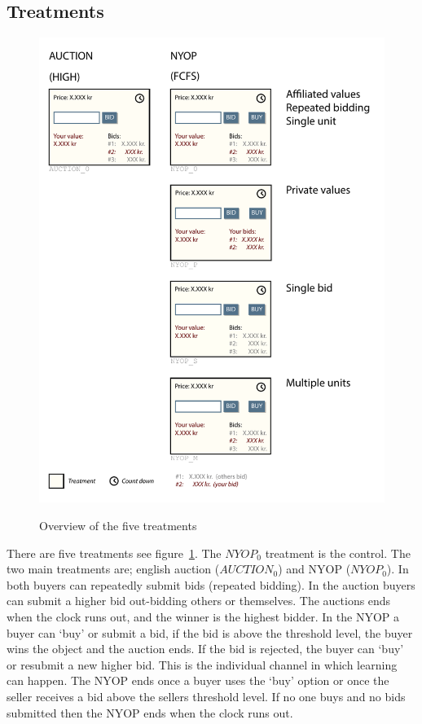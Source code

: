 \documentclass[a4paper,12pt]{article}
\makeatletter
\newcommand\fix{%
  \let\set@color\beamerorig@set@color
  \let\reset@color\beamerorig@reset@color}
\makeatother
\begin{document}

	\subsection{Treatments}

	\begin{figure}
	        \centering
	        \caption{ Overview of the five treatments}
	        \includegraphics[width=\textwidth]{Figures/Treatments}
			\label{fig:treatments}
	\end{figure}

	There are five treatments see figure~\ref{fig:treatments}. The $NYOP_0$ treatment is the control. The two main treatments are; english auction ($AUCTION_0$) and NYOP ($NYOP_0$).
	In both buyers can repeatedly submit bids (repeated bidding). In the auction buyers can submit a higher bid out-bidding others or themselves. The auctions ends when the clock runs out, and the winner is the highest bidder. In the NYOP a buyer can `buy' or submit a bid, if the bid is above the threshold level, the buyer wins the object and the auction ends. If the bid is rejected, the buyer can `buy' or resubmit a new higher bid. This is the individual channel in which learning can happen. The NYOP ends once a buyer uses the `buy' option or once the seller receives a bid above the sellers threshold level. If no one buys and no bids submitted then the NYOP ends when the clock runs out.
\end{document}
